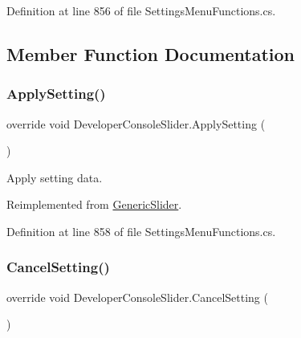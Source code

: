 Definition at line 856 of file Settings\+Menu\+Functions.\+cs.



\subsection{Member Function Documentation}
\mbox{\label{class_developer_console_slider_a4ccde136331b3d8afb4172ad107f31f5}} 
\subsubsection{\texorpdfstring{Apply\+Setting()}{ApplySetting()}}
{\footnotesize\ttfamily override void Developer\+Console\+Slider.\+Apply\+Setting (\begin{DoxyParamCaption}{ }\end{DoxyParamCaption})\hspace{0.3cm}{\ttfamily [virtual]}}



Apply setting data. 



Reimplemented from \hyperlink{class_generic_slider_ae98915fdb0f94d37222e83e93f6ac814}{Generic\+Slider}.



Definition at line 858 of file Settings\+Menu\+Functions.\+cs.

\mbox{\label{class_developer_console_slider_a2b3cb3192d1a3fd1d61e3ae7a1db0b29}} 
\subsubsection{\texorpdfstring{Cancel\+Setting()}{CancelSetting()}}
{\footnotesize\ttfamily override void Developer\+Console\+Slider.\+Cancel\+Setting (\begin{DoxyParamCaption}{ }\end{DoxyParamCaption})\hspace{0.3cm}{\ttfamily [virtual]}}



